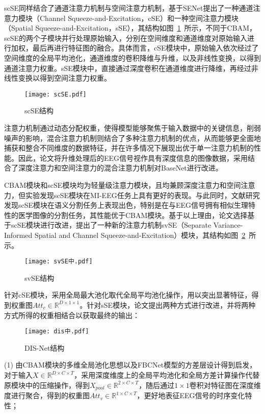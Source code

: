 scSE同样结合了通道注意力机制与空间注意力机制，基于SENet提出了一种通道注意力模块（Channel Squeeze-and-Excitation，cSE）和一种空间注意力模块（Spatial Squeeze-and-Excitation，sSE），其结构如图~\ref{fig:scSE}~所示，不同于CBAM，scSE的两个子模块并行处理原始输入，分别在空间维度和通道维度对原始输入进行加权，最后再进行特征图的融合。具体而言，cSE模块中，原始输入依次经过了空间维度的全局平均池化，通道维度的卷积降维与升维，以及非线性变换，以得到通道注意力权重。sSE模块中，直接通过深度卷积在通道维度进行降维，再经过非线性变换以得到空间注意力权重。
\begin{figure}
    \centering
    \texttt{[image: scSE.pdf]}
    \caption{scSE结构\cite{roy2018concurrent}}
    \label{fig:scSE}
\end{figure}

注意力机制通过动态分配权重，使得模型能够聚焦于输入数据中的关键信息，削弱噪声的影响，混合注意力机制则结合了多种注意力机制的优点，从而能够更全面地捕获和整合不同维度的数据特征，并在许多情况下展现出优于单一注意力机制的性能。因此，论文将升维处理后的EEG信号视作具有深度信息的图像数据，采用结合了深度注意力和空间注意力的混合注意力机制对BaseNet进行改进。

CBAM模块和scSE模块均为轻量级注意力模块，且均兼顾深度注意力和空间注意力，但实验发现scSE模块在MI-EEG任务上具有更好的表现。与此同时，文献\cite{roy2018concurrent}研究发现scSE模块在语义分割任务上表现出色，特别是在与EEG信号拥有相似生理特性的医学图像的分割任务，其性能优于CBAM模块。基于以上理由，论文选择基于scSE模块进行改进，提出了一种新的注意力机制svSE（Separate Variance-Informed Spatial and Channel Squeeze-and-Excitation）模块，其结构如图~\ref{fig:svSE}~所示。
\begin{figure}
    \centering
    \texttt{[image: svSE中.pdf]}
    \caption{svSE结构}
    \label{fig:svSE}
\end{figure}

针对cSE模块，采用全局最大池化取代全局平均池化操作，用以突出显著特征，得到权重图\(Att_c \in \mathbb{R}^{D \times 1 \times 1}\)。针对sSE模块，论文提出两种方式进行改进，并将两种方式所得的权重相结合以获取最终的输出：
\begin{figure}
  \centering
  \texttt{[image: dis中.pdf]}
  \caption{DIS-Net结构}
  \label{fig:dis}
\end{figure}

(1) 由CBAM模块的多维全局池化思想以及FBCNet模型的方差层设计\cite{mane2021fbcnet}得到启发，对于输入\(X \in \mathbb{R}^{D \times C \times T}\)，采用深度维度上的全局平均池化和全局方差计算操作代替原模块中的压缩操作，得到\(X_{pool} \in \mathbb{R}^{2 \times C \times T}\)，随后通过\(1\times1\)卷积对特征图在深度维度进行聚合，得到的权重图\(Att_v \in \mathbb{R}^{1 \times C \times T}\)，更好地表征EEG信号的时序变化特性；

